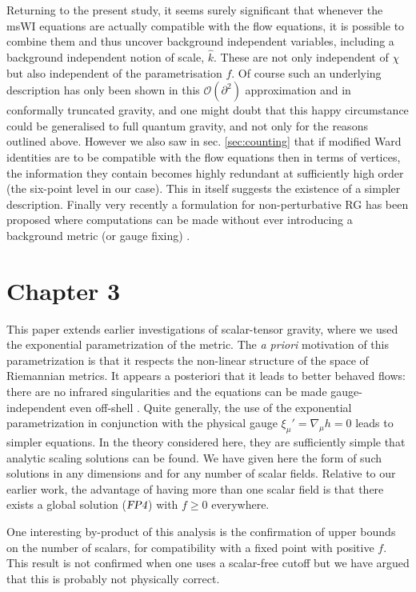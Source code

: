 \documentclass[11pt]{book}
\newcommand{\FPfour} {\textsl{FP4}}
\newcommand{\hk}{\hat k}
\numberwithin{equation}{chapter}
\begin{document}
Returning to the present study, it seems surely significant that
whenever the msWI equations  are actually compatible with the flow equations,
it is possible to combine them and thus uncover background independent variables,
including a background independent notion of scale, $\hk$.
These are not only independent of $\chi$ but also independent of the parametrisation $f$.
Of course such an underlying description has only been shown in this $\mathcal{O}(\partial^2)$ approximation and
in conformally truncated gravity, and one might doubt that this happy circumstance could be generalised to
full quantum gravity, and not only for the reasons outlined above.
However we also saw in sec. \ref{sec:counting} that if modified Ward identities are to be compatible with
the flow equations then in terms of vertices, the information they contain becomes highly redundant
at sufficiently high order (the six-point level in our case).
This in itself suggests the existence of a simpler description.
Finally very recently a formulation for non-perturbative RG has been proposed where computations can be
made without ever introducing a background metric (or gauge fixing) \cite{Morris:2016nda}.


\section*{Chapter 3}

This paper extends earlier investigations of scalar-tensor
gravity, where we used the exponential parametrization of the metric.
The {\it a priori} motivation of this parametrization is that
it respects the non-linear structure of the space of Riemannian metrics.
It appears a posteriori that it leads to better behaved flows:
there are no infrared singularities \cite{Percacci:2015wwa,Falls:2015qga}
and the equations can be made gauge-independent even off-shell
\cite{Falls:2015qga}.
Quite generally, the use of the exponential parametrization
in conjunction with the physical gauge $\xi_\mu'=\nabla_\mu h=0$
leads to simpler equations.
In the theory considered here, they are sufficiently simple
that analytic scaling solutions can be found.
We have given here the form of such solutions in any dimensions
and for any number of scalar fields.
Relative to our earlier work, the advantage of having more than
one scalar field is that there exists a global solution ($\FPfour$)
with $f\geq 0$ everywhere.

One interesting by-product of this analysis is the confirmation
of upper bounds on the number of scalars, for compatibility with
a fixed point with positive $f$.
This result is not confirmed when one uses a scalar-free cutoff
but we have argued that this is probably not physically correct.
\end{document}

